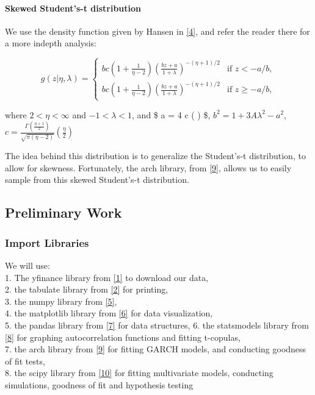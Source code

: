 \documentclass[11pt]{article}
\begin{document}
\paragraph{Skewed Student's-t
distribution}\label{skewed-students-t-distribution}

We use the density function given by Hansen in
\hyperref[references]{[4]}, and refer the reader there for a more
indepth analysis:

\[g(z|\eta, \lambda) =
\begin{cases}
    bc \left(1 + \frac{1}{\eta - 2} \right) \left( \frac{bz + a}{1 + \lambda} \right)^{-(\eta + 1)/2} & \text{if } z < -a/b, \\
    bc \left(1 + \frac{1}{\eta - 2} \right) \left( \frac{bz + a}{1 + \lambda} \right)^{-(\eta + 1)/2} & \text{if } z \geq -a/b,
\end{cases}\]

where \(2 < \eta < \infty\) and \(-1 < \lambda < 1\), and \$ a = 4
\lambda c \left(  \right) \$,
\(b^2 = 1 + 3A \lambda ^2 - a^2\),
\(c = \frac{\Gamma\left( \frac{\eta + 1}{2} \right)}{\sqrt{\pi (\eta - 2)}} \left( \frac{\eta}{2} \right)\)

The idea behind this distribution is to generalize the Student's-t
distribution, to allow for skewness. Fortunately, the arch library, from
\hyperref[references]{[9]}, allows us to easily sample from this skewed
Student's-t distribution.

    \subsection{Preliminary Work}\label{preliminary-work}

    \subsubsection{Import Libraries}\label{import-libraries}

We will use:\\
1. The yfinance library from \hyperref[references]{[1]} to download our
data,\\
2. the tabulate library from \hyperref[references]{[2]} for printing,\\
3. the numpy library from \hyperref[references]{[5]},\\
4. the matplotlib library from \hyperref[references]{[6]} for data
visualization,\\
5. the pandas library from \hyperref[references]{[7]} for data
structures, 6. the statsmodels library from \hyperref[references]{[8]}
for graphing autocorrelation functions and fitting t-copulas,\\
7. the arch library from \hyperref[references]{[9]} for fitting GARCH
models, and conducting goodness of fit tests,\\
8. the scipy library from \hyperref[references]{[10]} for fitting
multivariate models, conducting simulations, goodness of fit and
hypothesis testing
\end{document}
